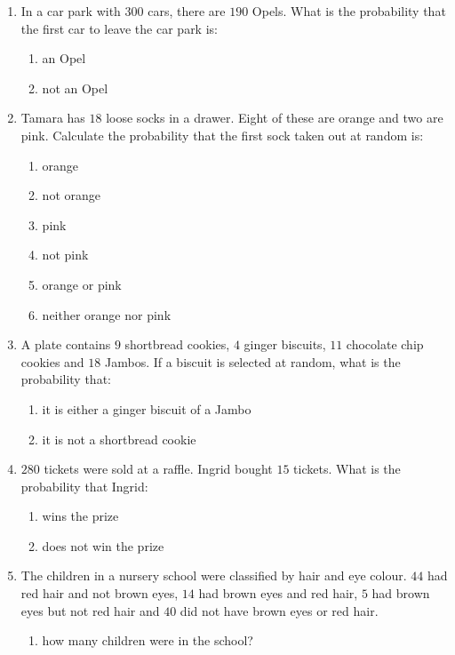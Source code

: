 \begin{eocexercises}{}
\begin{enumerate}[itemsep=5pt, label=\textbf{\arabic*}. ]
  \item In a car park with $300$ cars, there are $190$ Opels. What is the
    probability that the first car to leave the car park is:
    \begin{enumerate}[noitemsep, label=\textbf{(\alph*)} ]
    \item an Opel
    \item not an Opel
    \end{enumerate}
  \item Tamara has $18$ loose socks in a drawer. Eight of these are
    orange and two are pink. Calculate the probability that the first
    sock taken out at random is:
    \begin{enumerate}[noitemsep, label=\textbf{(\alph*)} ]
    \item orange
    \item not orange
    \item pink
    \item not pink
    \item orange or pink
    \item neither orange nor pink
    \end{enumerate}
  \item A plate contains $9$ shortbread cookies, $4$ ginger biscuits,
    $11$ chocolate chip cookies and $18$ Jambos. If a biscuit is
    selected at random, what is the probability that:
    \begin{enumerate}[noitemsep, label=\textbf{(\alph*)} ]
    \item it is either a ginger biscuit of a Jambo
    \item it is not a shortbread cookie
    \end{enumerate}
  \item $280$ tickets were sold at a raffle. Ingrid bought $15$
    tickets. What is the probability that Ingrid:
    \begin{enumerate}[noitemsep, label=\textbf{(\alph*)} ]
    \item wins the prize
    \item does not win the prize
    \end{enumerate}
  \item The children in a nursery school were classified by hair and
    eye colour. $44$ had red hair and not brown eyes, $14$ had brown eyes
    and red hair, $5$ had brown eyes but not red hair and $40$ did not
    have brown eyes or red hair.
    \begin{enumerate}[noitemsep, label=\textbf{(\alph*)} ]
    \item how many children were in the school?

\end{enumerate}
\end{enumerate}
\end{eocexercises}
